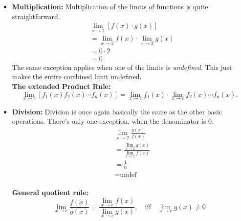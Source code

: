 \documentclass[12pt]{article}
\begin{document}
\begin{itemize}
                \item \textbf{Multiplication:}
                    \newline
                    Multiplication of the limits of functions is quite straightforward.
                    \begin{align*}
                        &\lim_{x \to 2} \left[ f(x) \cdot g(x) \right] \\
                        &= \lim_{x \to 2} f(x) \cdot \lim_{x \to 2} g(x) \\
                        &= 0 \cdot 2 \\
                        &= 0
                    \end{align*}
                    \newline
                    The same exception applies when one of the limits is \textit{undefined}. This just makes the entire combined limit undefined.
                    \\ \textbf{The extended Product Rule:}
                    \begin{equation*}
                        \lim_{x \to c} \left[ f_1(x) f_2(x) \cdots f_n(x) \right]
                        = \lim_{x \to c} f_1(x) \cdot \lim_{x \to c} f_2(x)
                        \cdots f_n(x).
                    \end{equation*}
                    \newline

                \item \textbf{Division:}
                    \newline
                    Division is once again basically the same as the other basic operations. There's only one exception, when the denominator is $0$.
                        \begin{align*}
                            &\lim_{x \to 2} \frac{g(x)}{f(x)} \\
                            &= \frac{\lim_{x \to 2} g(x)}{\lim_{x \to 2} f(x)} \\
                            &= \frac{1}{0} \\
                            &= \text{undef}
                        \end{align*}
                    \\ \textbf{General quotient rule:}
                    \begin{equation*}
                        \lim_{x \to c} \frac{f(x)}{g(x)}
                        = \frac{\lim_{x \to c} f(x)}{\lim_{x \to c} g(x)},
                        \quad \textrm{iff} \quad \lim_{x \to c} g(x) \ne 0
                    \end{equation*}
                    \newline


\end{itemize}
\end{document}
